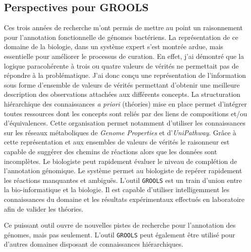 
\begin{refsegment}
\chapter*{Perspectives pour GROOLS}

Ces trois années de recherche m'ont permis de mettre au point un raisonnement pour l'annotation fonctionnelle de génomes bactériens. La représentation de ce domaine de la biologie, dans un système expert s'est montrée ardue, mais essentielle pour améliorer le processus de curation. En effet, j'ai démontré que la logique paracohérente à trois ou quatre valeurs de vérités ne permettait pas de répondre à la problématique. J'ai donc conçu une représentation de l'information sous forme d'ensemble de valeurs de vérités permettant d'obtenir une meilleure description des observations attachées aux différents concepts. La structuration hiérarchique des connaissances \textit{a priori} (théories) mise en place permet d'intégrer toutes ressources dont les concepts sont reliés par des liens de compositions et/ou d'équivalences. Cette organisation permet notamment d'utiliser les connaissances sur les réseaux métaboliques  de \textit{Genome Properties} et d'\textit{UniPathway}. Grâce à cette représentation et aux ensembles de valeurs de vérités le raisonneur est capable de suggérer des chemins de réactions alors que les données sont incomplètes. Le biologiste peut rapidement évaluer le niveau de complétion de l'annotation génomique. Le système permet au biologiste de repérer rapidement les réactions manquantes et ambiguës. L'outil \texttt{GROOLS} est un train d'union entre la bio-informatique et la biologie. Il est capable d'utiliser intelligemment les connaissances du domaine et les résultats expérimentaux effectués en laboratoire afin de valider les théories.

Ce puissant outil ouvre de nouvelles pistes de recherche pour l'annotation des génomes, mais pas seulement. L'outil \texttt{GROOLS} peut également être utilisé pour d'autres domaines disposant de connaissances hiérarchiques.


\end{refsegment}
